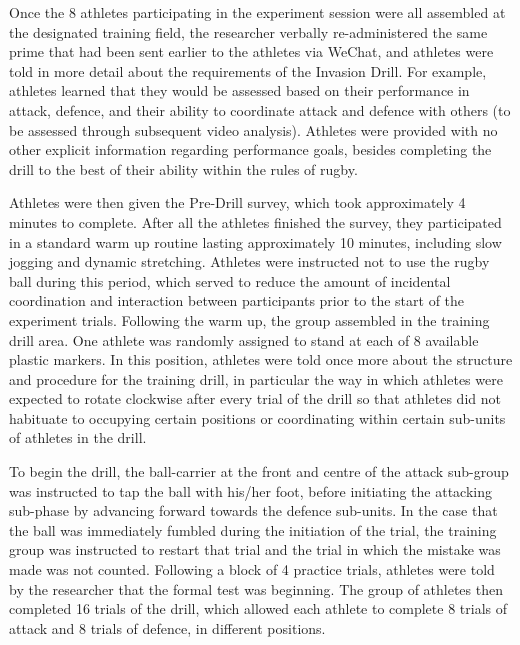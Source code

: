 \begin{CJK}{UTF8}{gbsn}
Once the 8 athletes participating in the experiment session were all assembled at the designated training field, the researcher verbally re-administered the same prime that had been sent earlier to the athletes via WeChat, and athletes were told in more detail about the requirements of the Invasion Drill.  For example, athletes learned that they would be assessed based on their performance in attack, defence, and their ability to coordinate attack and defence with others (to be assessed through subsequent video analysis).  Athletes were provided with no other explicit information regarding performance goals, besides completing the drill to the best of their ability within the rules of rugby.


Athletes were then given the Pre-Drill survey, which took approximately 4 minutes to complete.  After all the athletes finished the survey, they participated in a standard warm up routine lasting approximately 10 minutes, including slow jogging and dynamic stretching.  Athletes were instructed not to use the rugby ball during this period, which served to reduce the amount of incidental coordination and interaction between participants prior to the start of the experiment trials.  Following the warm up, the group assembled in the training drill area.  One athlete was randomly assigned to stand at each of 8 available plastic markers.  In this position, athletes were told once more about the structure and procedure for the training drill, in particular the way in which athletes were expected to rotate clockwise after every trial of the drill so that athletes did not habituate to occupying certain positions or coordinating within certain sub-units of athletes in the drill.

To begin the drill, the ball-carrier at the front and centre of the attack sub-group was instructed to tap the ball with his/her foot, before initiating the attacking sub-phase by advancing forward towards the defence sub-units.  In the case that the ball was immediately fumbled during the initiation of the trial, the training group was instructed to restart that trial and the trial in which the mistake was made was not counted.  Following a block of 4 practice trials, athletes were told by the researcher that the formal test was beginning.  The group of athletes then completed 16 trials of the drill, which allowed each athlete to complete 8 trials of attack and 8 trials of defence, in different positions.


\end{CJK}
